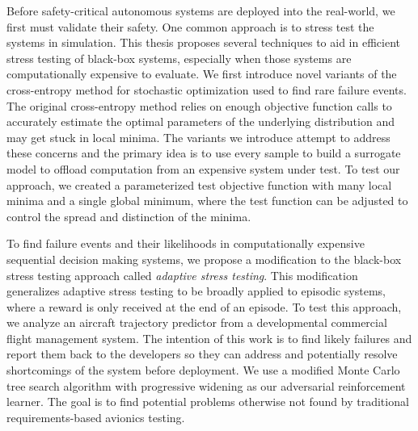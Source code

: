 Before safety-critical autonomous systems are deployed into the real-world, we first must validate their safety.
One common approach is to stress test the systems in simulation.
This thesis proposes several techniques to aid in efficient stress testing of black-box systems, especially when those systems are computationally expensive to evaluate.
We first introduce novel variants of the cross-entropy method for stochastic optimization used to find rare failure events.
The original cross-entropy method relies on enough objective function calls to accurately estimate the optimal parameters of the underlying distribution and may get stuck in local minima.
The variants we introduce attempt to address these concerns and the primary idea is to use every sample to build a surrogate model to offload computation from an expensive system under test.
To test our approach, we created a parameterized test objective function with many local minima and a single global minimum, where the test function can be adjusted to control the spread and distinction of the minima.

To find failure events and their likelihoods in computationally expensive sequential decision making systems, we propose a modification to the black-box stress testing approach called \textit{adaptive stress testing}.
This modification generalizes adaptive stress testing to be broadly applied to episodic systems, where a reward is only received at the end of an episode.
To test this approach, we analyze an aircraft trajectory predictor from a developmental commercial flight management system.
The intention of this work is to find likely failures and report them back to the developers so they can address and potentially resolve shortcomings of the system before deployment. 
We use a modified Monte Carlo tree search algorithm with progressive widening as our adversarial reinforcement learner.
The goal is to find potential problems otherwise not found by traditional requirements-based avionics testing.

